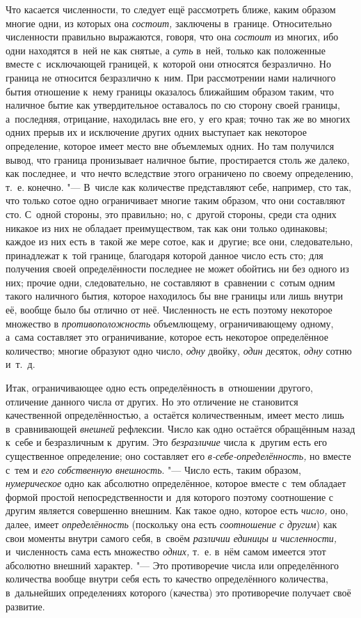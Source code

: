Что касается численности, то следует ещё рассмотреть ближе, каким образом
многие одни, из которых она {\em состоит,} заключены в~границе. Относительно
численности правильно выражаются, говоря, что она {\em состоит} из многих, ибо
одни находятся в~ней не как снятые, а {\em суть} в~ней, только как положенные
вместе с~исключающей границей, к~которой они относятся безразлично. Но граница
не относится безразлично к~ним. При рассмотрении нами наличного бытия отношение
к~нему границы оказалось ближайшим образом таким, что наличное бытие как
утвердительное оставалось по сю сторону своей границы, а~последняя, отрицание,
находилась вне его, у~его края; точно так же во многих одних прерыв их и
исключение других одних выступает как некоторое определение, которое имеет
место вне объемлемых одних. Но там получился вывод, что граница пронизывает
наличное бытие, простирается столь же далеко, как последнее, и~что нечто
вследствие этого ограничено по своему определению, т.~е. конечно. "---
В~числе как количестве представляют себе, например, сто так,
что только сотое одно ограничивает многие таким образом, что они составляют
сто. С~одной стороны, это правильно; но, с~другой стороны, среди ста одних
никакое из них не обладает преимуществом, так как они только одинаковы; каждое
из них есть в~такой же мере сотое, как и~другие; все они, следовательно,
принадлежат к~той границе, благодаря которой данное число есть сто; для
получения своей определённости последнее не может обойтись ни без одного из
них; прочие одни, следовательно, не составляют в~сравнении с~сотым одним такого
наличного бытия, которое находилось бы вне границы или лишь внутри её, вообще
было бы отлично от неё. Численность не есть поэтому некоторое множество в {\em
противоположность} объемлющему, ограничивающему одному, а~сама составляет это
ограничивание, которое есть некоторое определённое количество; многие образуют
одно число, {\em одну} двойку, {\em один} десяток, {\em одну} сотню и~т.~д.

Итак, ограничивающее одно есть определённость в~отношении другого, отличение
данного числа от других. Но это отличение не становится качественной
определённостью, а~остаётся количественным, имеет место лишь в~сравнивающей
{\em внешней} рефлексии. Число как одно остаётся обращённым назад к~себе и
безразличным к~другим. Это {\em безразличие} числа к~другим есть его
существенное определение; оно составляет его {\em в-себе-определённость,} но
вместе с~тем и {\em его собственную внешность}. "--- Число есть, таким образом,
{\em нумерическое} одно как абсолютно определённое, которое вместе с~тем
обладает формой простой непосредственности и~для которого поэтому соотношение с
другим является совершенно внешним. Как такое одно, которое есть {\em число,}
оно, далее, имеет {\em определённость} (поскольку она есть {\em соотношение с
другим}) как свои моменты внутри самого себя, в~своём {\em различии единицы и
численности,} и~численность сама есть множество {\em одних,} т.~е. в~нём самом
имеется этот абсолютно внешний характер. "--- Это противоречие числа или
определённого количества вообще внутри себя есть то качество определённого
количества, в~дальнейших определениях которого (качества) это противоречие
получает своё развитие.


